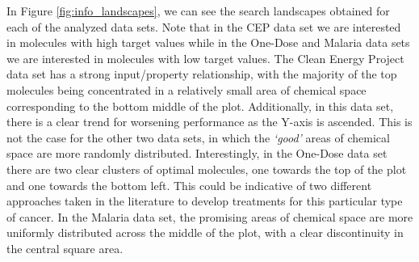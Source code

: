 In Figure \ref{fig:info_landscapes}, we can see the search landscapes obtained
for each of the analyzed data sets. Note that in the CEP data set we are interested in molecules with high target values while in the One-Dose and Malaria data sets we are interested in molecules with low target values.
The Clean Energy Project data set has a strong input/property
relationship, with the majority of the top molecules being concentrated in a
relatively small area of chemical space corresponding to the bottom middle of the plot. 
Additionally, in this data set, there
is a clear trend for worsening performance as the Y-axis is ascended.  This is
not the case for the other two data sets, in which the \emph{`good'} areas of chemical
space are more randomly distributed. Interestingly, in the One-Dose
data set there are two clear clusters of optimal molecules, one
towards the top of the plot and one towards the bottom left. This could be
indicative of two different approaches taken in the literature to develop treatments for this particular type of cancer. In the Malaria data set, the promising areas of chemical space are more uniformly distributed across the middle of the plot, with a clear discontinuity in the central square area.